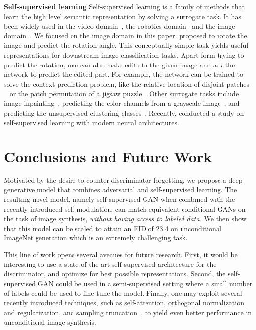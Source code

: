 \documentclass[10pt,twocolumn,letterpaper]{article}
\begin{document}
\vspace{3mm}
\noindent\textbf{Self-supervised learning}\quad
Self-supervised learning is a family of methods that learn the high level semantic representation by solving a surrogate task.
It has been widely used in the video domain~\citep{agrawal2015learning,lee2017unsupervised}, the robotics domain~\citep{jang2018grasp2vec,pinto2016supersizing} and the image domain~\citep{doersch2015unsupervised, caron2018deep}. We focused on the image domain in this paper. \citet{gidaris2018unsupervised} proposed to rotate the image and predict the rotation angle. This conceptually simple task yields useful representations for downstream image classification tasks. Apart form trying to predict the rotation, one can also make edits to the given image and ask the network to predict the edited part. For example, the network can be trained to solve the context prediction problem, like the relative location of disjoint patches ~\citep{doersch2015unsupervised, mundhenk2018improvements} or the patch permutation of a jigsaw puzzle~\citep{noroozi2016unsupervised}.
Other surrogate tasks include image inpainting~\citep{pathak2016context}, predicting the color channels from a grayscale image~\citep{zhang2016colorful}, and predicting the unsupervised clustering classes~\citep{caron2018deep}.
Recently, \citet{kolesnikov2019revisiting} conducted a study on self-supervised learning with modern neural architectures.
 \section{Conclusions and Future Work}

Motivated by the desire to counter discriminator forgetting, we propose a deep generative model that combines adversarial and self-supervised learning. The resulting novel model, namely self-supervised GAN when combined with the recently introduced self-modulation, can match equivalent conditional GANs on the task of image synthesis, \emph{without having access to labeled data.}
We then show that this model can be scaled to attain an FID of 23.4 on unconditional ImageNet generation which is an extremely challenging task.

This line of work opens several avenues for future research. First, it would be interesting to use a state-of-the-art self-supervised architecture for the discriminator, and optimize for best possible representations. Second, the self-supervised GAN could be used in a semi-supervised setting where a small number of labels could be used to fine-tune the model. Finally, one may exploit several recently introduced techniques, such as self-attention, orthogonal normalization and regularization, and sampling truncation~\citep{zhang2018self,brock2018large}, to yield even better performance in unconditional image synthesis.
\end{document}
